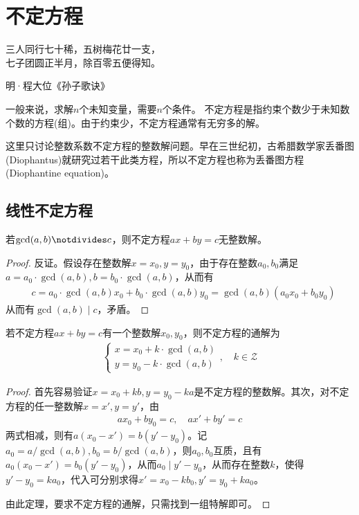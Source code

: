 
\chapter{不定方程}
\label{chap:diophantine-equation}

\epigraph{三人同行七十稀，五树梅花廿一支，\\七子团圆正半月，除百零五便得知。}{明·程大位《孙子歌诀》}

一般来说，求解$n$个未知变量，需要$n$个条件。
不定方程是指约束个数少于未知数个数的方程(组)。由于约束少，不定方程通常有无穷多的解。

这里只讨论整数系数不定方程的整数解问题。早在三世纪初，古希腊数学家丢番图(Diophantus)就研究过若干此类方程，所以不定方程也称为丢番图方程(Diophantine equation)。

\section{线性不定方程}
\label{sec:linear-diophantine-equation}

\begin{theorem}
  若$\gcd(a,b)\notdivides c$，则不定方程$ax+by=c$无整数解。
\end{theorem}
\begin{proof}
  反证。假设存在整数解$x=x_0, y=y_0$，由于存在整数$a_0,b_0$满足$a=a_0\cdot\gcd(a,b), b=b_0\cdot\gcd(a,b)$，从而有
  \begin{align*}
    &c=a_0\cdot\gcd(a,b)x_0 + b_0\cdot\gcd(a,b)y_0=\gcd(a,b)(a_0x_0+b_0y_0)
  \end{align*}
  从而有$\gcd(a,b)\mid c$，矛盾。
\end{proof}

\begin{theorem}
  若不定方程$ax+by=c$有一个整数解$x_0, y_0$，则不定方程的通解为
  \begin{align*}
    \begin{cases}
      x=x_0+k\cdot\gcd(a,b)\\
      y=y_0-k\cdot\gcd(a,b)
    \end{cases}, \quad k\in\mathcal{Z}
  \end{align*}
\end{theorem}
\begin{proof}
  首先容易验证$x=x_0+kb, y=y_0-ka$是不定方程的整数解。其次，对不定方程的任一整数解$x=x', y=y'$，由
  \begin{align*}
    ax_0 + by_0 =c, \quad ax' + by' =c
  \end{align*}
  两式相减，则有$a(x_0-x')=b(y'-y_0)$。记$a_0=a/\gcd(a,b), b_0=b/\gcd(a,b)$，则$a_0,b_0$互质，且有$a_0(x_0-x')=b_0(y'-y_0)$，从而$a_0\mid y'-y_0$，从而存在整数$k$，使得$y'-y_0=ka_0$，代入可分别求得$x'=x_0-kb_0, y'=y_0+ka_0$。

  由此定理，要求不定方程的通解，只需找到一组特解即可。
\end{proof}

